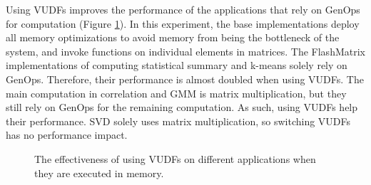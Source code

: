 Using VUDFs improves the performance of the applications that rely on GenOps
for computation (Figure \ref{perf:opts_CPU}). In this experiment, the base
implementations deploy all memory optimizations to avoid memory from being
the bottleneck of the system,
and invoke functions on individual elements in
matrices. The FlashMatrix implementations of computing statistical summary
and k-means solely rely on GenOps. Therefore, their performance is almost doubled
when using VUDFs. The main computation in correlation and GMM is matrix
multiplication, but they still rely on GenOps for the remaining computation.
As such, using VUDFs help their performance. SVD solely uses matrix
multiplication, so switching VUDFs has no performance impact.

\begin{figure}
	\begin{center}
		\footnotesize
		\vspace{-15pt}
		
		\vspace{-10pt}
		\caption{The effectiveness of using VUDFs on different applications
		when they are executed in memory.}
		\label{perf:opts_CPU}
	\end{center}
\end{figure}
